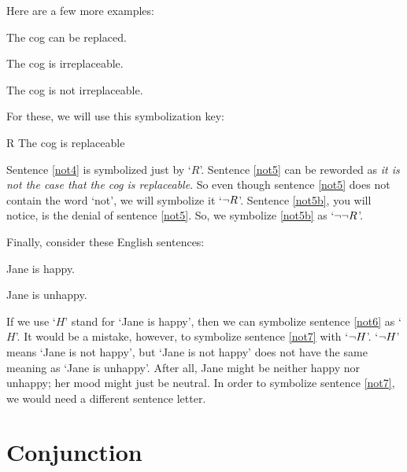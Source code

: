 Here are a few more examples:
	\begin{earg}
		\item[\ex{not4}] The cog can be replaced.
		\item[\ex{not5}] The cog is irreplaceable.
		\item[\ex{not5b}] The cog is not irreplaceable.
	\end{earg}
For these, we will use this symbolization key:
	\begin{ekey}
		\item[R] The cog is replaceable
	\end{ekey}
Sentence \ref{not4} is symbolized just by `$R$'. Sentence \ref{not5} can be reworded as \textit{it is not the case that the cog is replaceable}. So even though sentence \ref{not5} does not contain the word `not', we will symbolize it `${\neg} R$'.
Sentence \ref{not5b}, you will notice, is the denial of sentence \ref{not5}. So, we symbolize \ref{not5b} as `${\neg}{\neg} R$'.

Finally, consider these English sentences:
	\begin{earg}
		\item[\ex{not6}] Jane is happy.
		\item[\ex{not7}] Jane is unhappy.
	\end{earg}
If we use `$H$' stand for `Jane is happy', then we can symbolize sentence \ref{not6} as `$H$'. It would be a mistake, however, to symbolize sentence \ref{not7} with `${\neg}{H}$'. 
`${\neg}{H}$' means `Jane is not happy', but `Jane is not happy' does not have the same meaning as `Jane is unhappy'. After all, Jane might be neither happy nor unhappy; her mood might just be neutral. In order to symbolize sentence \ref{not7}, we would need a different sentence letter.


\section{Conjunction}
\label{s:ConnectiveConjunction}

